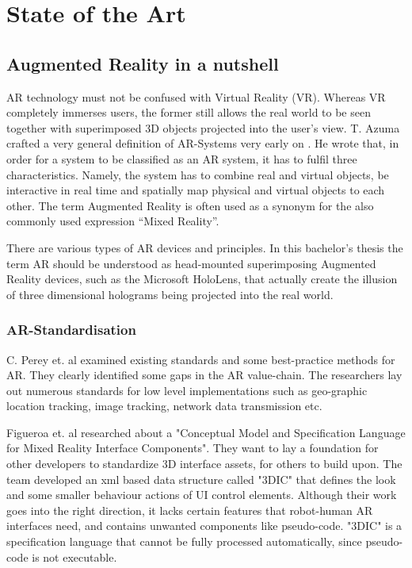 \chapter{State of the Art}\label{Chap:StateOfTheArt}

\section{Augmented Reality in a nutshell}

AR technology must not be confused with Virtual Reality (VR). Whereas VR completely immerses
users, the former still allows the real world to be seen together with superimposed 3D objects
projected into the user's view. T. Azuma crafted a very general definition of AR-Systems very early
on \cite{azuma1997survey}. He wrote that, in order for a system to be classified as an AR system, it has to fulfil three
characteristics. Namely, the system has to combine real and virtual objects, be interactive in real time
and spatially map physical and virtual objects to each other. The term Augmented Reality is often
used as a synonym for the also commonly used expression “Mixed Reality”. 

There are various types of AR devices and principles. In this bachelor's thesis the term AR should be understood as head-mounted superimposing Augmented Reality devices, such as the Microsoft HoloLens, that actually create the illusion of three dimensional holograms being projected into the real world.

\subsection{AR-Standardisation}

C. Perey et. al \cite{perey2011current} examined existing standards and some best-practice methods for AR. They clearly identified some gaps in the AR value-chain. The researchers lay out numerous standards for low level implementations such as geo-graphic location tracking, image tracking, network data transmission etc.

Figueroa et. al \cite{figueroa2006conceptual} researched about a "Conceptual Model and Specification Language for Mixed Reality Interface Components". They want to lay a foundation for other developers to standardize 3D interface assets, for others to build upon. The team developed an xml based data structure called "3DIC" that defines the look and some smaller behaviour actions of UI control elements. Although their work goes into the right direction, it lacks certain features that robot-human AR interfaces need, and contains unwanted components like pseudo-code. "3DIC" is a specification language that cannot be fully processed automatically, since pseudo-code is not executable. 

